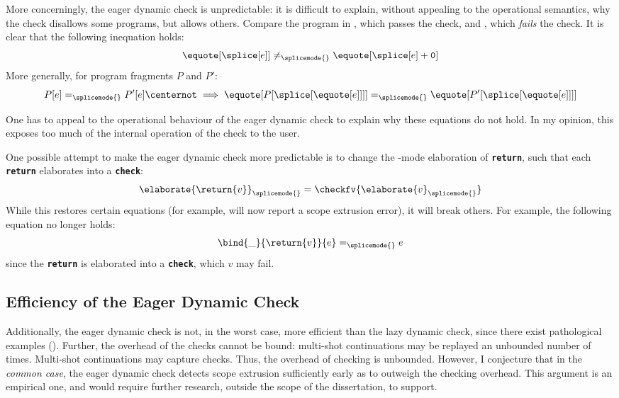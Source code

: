 More concerningly, the eager dynamic check is unpredictable: it is difficult to explain, without appealing to the operational semantics, why the check disallows some programs, but allows others. Compare the program in , which passes the check, and , which \textit{fails} the check. It is clear that the following inequation holds:
\[\equote[\splice[e]] \neq_{\splicemode{}} \equote[{\splice[e] + \texttt{0}}]\]
More generally, for program fragments $P$ and $P'$:
\[P[e] =_{\splicemode{}} P'[e] \centernot\implies \equote[{P[\splice[{\equote[e]}]]}] =_{\splicemode{}} \equote[{P'[\splice[{\equote[e]}]]}]\]

One has to appeal to the operational behaviour of the eager dynamic check to explain why these equations do not hold. In my opinion, this exposes too much of the internal operation of the check to the user. 

One possible attempt to make the eager dynamic check more predictable is to change the \splicemode{}-mode elaboration of \textbf{\texttt{return}}, such that each \textbf{\texttt{return}} elaborates into a \textbf{\texttt{check}}:
\[\elaborate{\return{v}}_{\splicemode{}} = \checkfv{\elaborate{v}_{\splicemode{}}}\]
While this restores certain equations (for example,  will now report a scope extrusion error), it will break others. For example, the following equation no longer holds:
\[\bind{\_}{\return{v}}{e} =_{\splicemode{}} e\]
since the \textbf{\texttt{return}} is elaborated into a \textbf{\texttt{check}}, which $v$ may fail.

\subsection{Efficiency of the Eager Dynamic Check}\label{subsection:eager-dynamic-efficiency}
Additionally, the eager dynamic check is not, in the worst case, more efficient than the lazy dynamic check, since there exist pathological examples (). Further, the overhead of the checks cannot be bound: multi-shot continuations may be replayed an unbounded number of times. Multi-shot continuations may capture checks. Thus, the overhead of checking is unbounded. However, I conjecture that in the \textit{common case}, the eager dynamic check detects scope extrusion sufficiently early as to outweigh the checking overhead. This argument is an empirical one, and would require further research, outside the scope of the dissertation, to support. 


